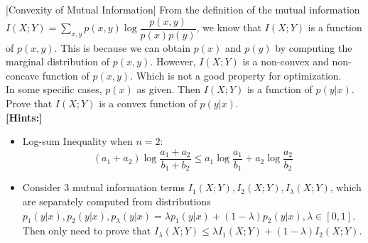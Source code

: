 \item {} [Convexity of Mutual Information] From the definition of the mutual information $I(X;Y)=\sum\limits_{x,y}p(x,y)\log\dfrac{p(x,y)}{p(x)p(y)}$, we know that $I(X;Y)$ is a function of $p(x,y)$. This is because we can obtain $p(x)$ and $p(y)$ by computing the marginal distribution of $p(x,y)$. However, $I(X;Y)$ is a non-convex and non-concave function of $p(x,y)$. Which is not a good property for optimization. \\
In some specific cases, $p(x)$ as given. Then $I(X;Y)$ is a function of $p(y|x)$. Prove that $I(X;Y)$ is a convex function of $p(y|x)$. \\
\textbf{[Hints:]}
\begin{itemize}
\item Log-sum Inequality when $n=2$:
$$(a_1+a_2)\log\dfrac{a_1+a_2}{b_1+b_2}\leq a_1\log\dfrac{a_1}{b_1}+a_2\log\dfrac{a_2}{b_2}$$
\item Consider $3$ mutual information terms $I_1(X;Y), I_2(X;Y), I_{\lambda}(X;Y)$, which are separately computed from distributions $p_1(y|x), p_2(y|x), p_{\lambda}(y|x)=\lambda p_1(y|x)+(1-\lambda)p_2(y|x), \lambda\in[0,1]$. Then only need to prove that $I_{\lambda}(X;Y)\leq \lambda I_1(X;Y)+(1-\lambda)I_2(X;Y)$.
\end{itemize}

\solution

